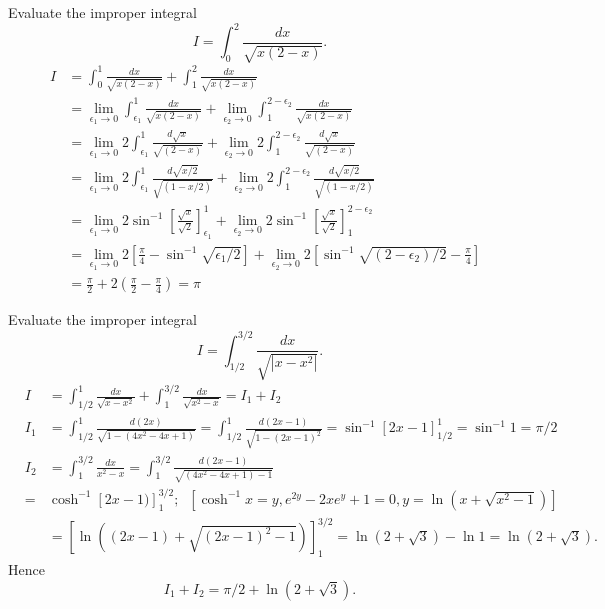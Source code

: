 \documentclass{article}
\begin{document}
\vspace{0.2in}

\newpage

 Evaluate the improper integral
$$
I = \int_0^2  \frac{d x}{\sqrt{x (2-x)}}.
$$
\begin{eqnarray*}
& I & = \int_0^1  \frac{d x}{\sqrt{x (2-x)}} + \int_1^2
\frac{d x }{\sqrt{x (2-x)}} \\
&  & = \lim_{\epsilon_1 \to 0} \int_{\epsilon_1}^1
\frac{dx}{\sqrt{x (2-x)}} + \lim_{\epsilon_2 \to 0}
 \int_{1}^{2-\epsilon_2} \frac{dx}{\sqrt{x (2-x)}}\\
 &  & = \lim_{\epsilon_1 \to 0} 2 \int_{\epsilon_1}^1
\frac{d \sqrt{x} }{\sqrt{(2-x)}} + \lim_{\epsilon_2 \to 0}
 2 \int_{1}^{2-\epsilon_2}  \frac{d\sqrt{x}}{\sqrt{(2-x)}}\\
  &  & = \lim_{\epsilon_1 \to 0} 2 \int_{\epsilon_1}^1
\frac{d \sqrt{x/2} }{\sqrt{(1-x/2)}} + \lim_{\epsilon_2 \to 0}
 2 \int_{1}^{2-\epsilon_2}  \frac{d\sqrt{x/2}}{\sqrt{(1-x/2)}}\\
 &  & = \lim_{\epsilon_1 \to 0} 2 \sin^{-1} \left[ \frac{\sqrt{x} }{\sqrt{2} }
 \right]_{\epsilon_1}^1 + \lim_{\epsilon_2 \to 0} 2 \sin^{-1} \left[ \frac{\sqrt{x} }{\sqrt{2} }
 \right]_1^{2-\epsilon_2}\\
  &  & = \lim_{\epsilon_1 \to 0} 2
  \left[ \frac{\pi}{4}- \sin^{-1} \sqrt{\epsilon_1/2} \right]
 + \lim_{\epsilon_2 \to 0} 2
  \left[\sin^{-1} \sqrt{(2-\epsilon_2)/2} -\frac{\pi}{4}
  \right]\\
   &  & =  \frac{\pi}{2}+ 2
  \left( \frac{\pi}{2} -\frac{\pi}{4}
  \right)= \pi
\end{eqnarray*}

\bigskip

 Evaluate the improper integral
$$
I = \int_{1/2}^{3/2}  \frac{d x}{\sqrt{|x-x^2|} }.
$$
\begin{eqnarray*}
& I & = \int_{1/2}^{1}  \frac{d x}{\sqrt{x-x^2} }+ \int_{1}^{3/2}  \frac{d x}{\sqrt{x^2-x} }=I_1+I_2\\
& I_1 & = \int_{1/2}^{1}  \frac{d (2x)}{\sqrt{1- (4x^2-4x+1)}}=
\int_{1/2}^{1} \frac{d (2x-1) }{\sqrt{1-(2x- 1)^2}
}=\sin^{-1}[2x-1]_{1/2}^{1}=\sin^{-1} 1=\pi/2 \\
& I_2 & =\int_{1}^{3/2}  \frac{d x}{x^2-x }= \int_{1}^{3/2}
\frac{d (2x-1)}{\sqrt{(4x^2-4x+1)-1}} \\
&=& \cosh^{-1} \left[ 2x-1)\right]_1^{3/2}; \;\;
 [ \cosh^{-1}x=y, e^{2y}-2x e^y+1=0, y=\ln(x+\sqrt{x^2-1})] \\
& & = \left[ \ln((2x-1)+\sqrt{(2x-1)^2-1})\right]_1^{3/2}=\ln
(2+\sqrt{3})-\ln 1=\ln (2+\sqrt{3}).
\end{eqnarray*}
Hence
$$
I_1+I_2= \pi/2+ \ln (2+\sqrt{3}).
$$
\end{document}
